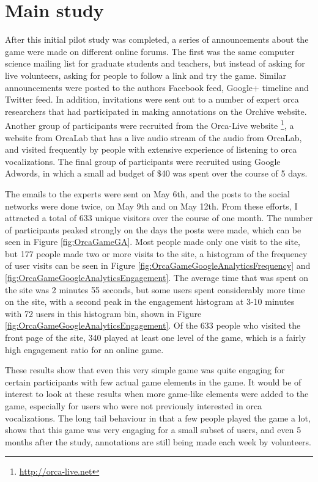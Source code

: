 \documentclass[12pt,oneside]{book}
\begin{document}
\section{Main study}

After this initial pilot study was completed, a series of
announcements about the game were made on different online forums.
The first was the same computer science mailing list for graduate
students and teachers, but instead of asking for live volunteers,
asking for people to follow a link and try the game.  Similar
announcements were posted to the authors Facebook feed, Google+
timeline and Twitter feed.  In addition, invitations were sent out to
a number of expert orca researchers that had participated in making
annotations on the Orchive website.  Another group of participants
were recruited from the Orca-Live
website \footnote{\url{http://orca-live.net}}, a website from OrcaLab
that has a live audio stream of the audio from OrcaLab, and visited
frequently by people with extensive experience of listening to orca
vocalizations.  The final group of participants were recruited using
Google Adwords, in which a small ad budget of \$40 was spent over the
course of 5 days.

The emails to the experts were sent on May 6th, and the posts to the
social networks were done twice, on May 9th and on May 12th.  From
these efforts, I attracted a total of 633 unique visitors over the
course of one month.  The number of participants peaked strongly on
the days the posts were made, which can be seen in Figure
\ref{fig:OrcaGameGA}.  Most people made only one visit to the site,
but 177 people made two or more visits to the site, a histogram of the
frequency of user visits can be seen in Figure
\ref{fig:OrcaGameGoogleAnalyticsFrequency} and
\ref{fig:OrcaGameGoogleAnalyticsEngagement}.  The average time that
was spent on the site was 2 minutes 55 seconds, but some users spent
considerably more time on the site, with a second peak in the
engagement histogram at 3-10 minutes with 72 users in this histogram
bin, shown in Figure \ref{fig:OrcaGameGoogleAnalyticsEngagement}.  Of
the 633 people who visited the front page of the site, 340 played at
least one level of the game, which is a fairly high engagement ratio
for an online game.

These results show that even this very simple game was quite engaging
for certain participants with few actual game elements in the game.
It would be of interest to look at these results when more game-like
elements were added to the game, especially for users who were not
previously interested in orca vocalizations.  The long tail behaviour
\cite{heidorn2008shedding} in that a few people played the game a lot,
shows that this game was very engaging for a small subset of users,
and even 5 months after the study, annotations are still being made
each week by volunteers.
\end{document}
